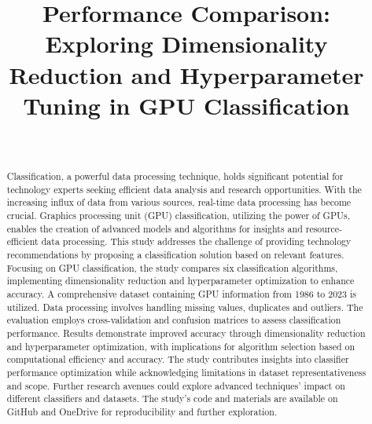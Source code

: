 \documentclass[conference,onecolumn]{IEEEtran}
\begin{document}
\title{Performance Comparison: Exploring Dimensionality Reduction and Hyperparameter Tuning in GPU Classification}

\author{\\
}

\maketitle

\begin{abstract}
    Classification, a powerful data processing technique, holds significant potential for technology experts seeking efficient data analysis and research opportunities. With the increasing influx of data from various sources, real-time data processing has become crucial. Graphics processing unit (GPU) classification, utilizing the power of GPUs, enables the creation of advanced models and algorithms for insights and resource-efficient data processing. This study addresses the challenge of providing technology recommendations by proposing a classification solution based on relevant features. Focusing on GPU classification, the study compares six classification algorithms, implementing dimensionality reduction and hyperparameter optimization to enhance accuracy. A comprehensive dataset containing GPU information from 1986 to 2023 is utilized. Data processing involves handling missing values, duplicates and outliers. The evaluation employs cross-validation and confusion matrices to assess classification performance. Results demonstrate improved accuracy through dimensionality reduction and hyperparameter optimization, with implications for algorithm selection based on computational efficiency and accuracy. The study contributes insights into classifier performance optimization while acknowledging limitations in dataset representativeness and scope. Further research avenues could explore advanced techniques' impact on different classifiers and datasets. The study's code and materials are available on GitHub and OneDrive for reproducibility and further exploration.
\end{abstract}
\end{document}
